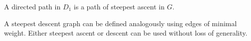 \documentclass{article}
\begin{document}
A directed path in $D_1$ is a path of steepest ascent in $G$.

A steepest descent graph can be defined analogously using edges of
minimal weight. Either steepest ascent or descent can be used without
loss of generality.

\begin{figure}
  \centering
  \\

\end{figure}
\end{document}
